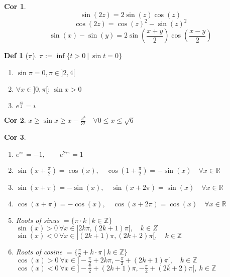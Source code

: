 \documentclass[a4paper, 10pt]{article}
\newtheorem*{corollary}{Cor}
\theoremstyle{definition}
\newtheorem*{definition}{Def}
\theoremstyle{named}
\newcommand{\R}{\mathbb{R}}
\newcommand{\Z}{\mathbb{Z}}
\begin{document}
\begin{corollary}
    $$\sin(2z) = 2 \sin(z)\cos(z)$$
    $$\cos(2z) = \cos(z)^2 - \sin(z)^2$$
    $$\sin(x) - \sin(y) = 2 \sin\left(\frac{x + y}{2}\right)\cos\left(\frac{x - y}{2}\right)$$
\end{corollary}

\begin{definition}[$\pi$]
    $\pi := \inf \{ t > 0 \ | \ \sin t = 0\}$
    \begin{enumerate}[label=(\roman*)]
        \item $\sin \pi = 0, \pi \in ]2, 4[$
        \item $\forall x \in ]0, \pi[$: $\sin x > 0$
        \item $e^{\frac{i \pi}{2}} = i$
    \end{enumerate}
\end{definition}

\begin{corollary}
    $x \geq \sin x \geq x - \frac{x^3}{3!} \quad \forall 0 \leq x \leq \sqrt{6}$
\end{corollary}

\begin{corollary}
    \begin{enumerate}
        \item $e^{i\pi}=-1, \qquad e^{2i\pi}=1$
        \item $\sin(x+\frac{\pi}{2}) = \cos(x), \quad \cos(1+\frac{\pi}{2}) = -\sin(x) \quad \forall x \in \R$
        \item $\sin(x+\pi)=-\sin(x), \quad \sin(x+2\pi) = \sin(x) \quad \forall x \in \R$
        \item $\cos(x+\pi) = -\cos(x), \quad \cos(x+2\pi) = \cos(x) \quad \forall x \in \R$
        \item Roots of sinus $= \{\pi \cdot k \ | \ k \in \Z \}$ \\ 
        $\sin(x) > 0 \ \forall x \in ] 2k \pi, (2k + 1)\pi [, \quad k \in Z$ \\
        $\sin(x) < 0 \ \forall x \in ] (2k + 1)\pi, (2k + 2) \pi [, \quad k \in \Z$
        \item Roots of cosine $= \{\frac{\pi}{2} + k \cdot \pi \ | \ k \in \Z \}$ \\
        $\cos(x) > 0 \ \forall x \in ] - \frac{\pi}{2} + 2k \pi, - \frac{\pi}{2} + (2k + 1)\pi [, \quad k \in \Z$ \\
        $\cos(x) < 0 \ \forall x \in ] -\frac{\pi}{2} + (2k + 1) \pi, - \frac{\pi}{2} + (2k + 2) \pi [, \ k \in \Z$
    \end{enumerate}
\end{corollary}
\end{document}
